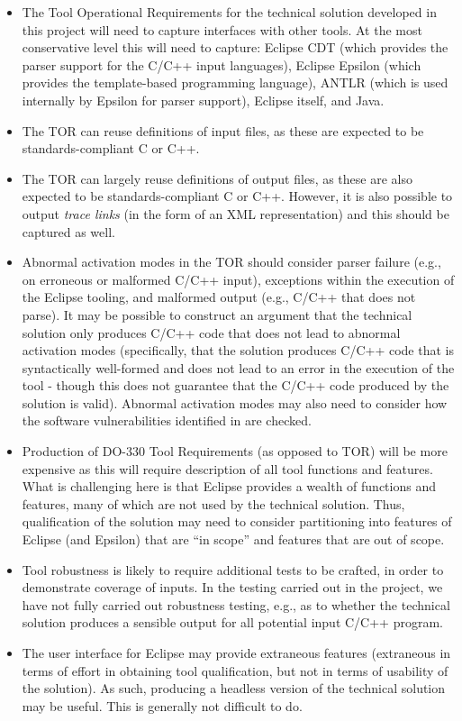 \documentclass{llncs}
\begin{document}
\begin{itemize}
\item The Tool Operational Requirements for the technical solution developed in this project will need to capture interfaces with other tools. At the most conservative level this will need to capture: Eclipse CDT (which provides the parser support for the C/C++ input languages), Eclipse Epsilon (which provides the template-based programming language), ANTLR (which is used internally by Epsilon for parser support), Eclipse itself, and Java.

\item The TOR can reuse definitions of input files, as these are expected to be standards-compliant C or C++.

\item The TOR can largely reuse definitions of output files, as these are also expected to be standards-compliant C or C++. However, it is also possible to output \textit{trace links} (in the form of an XML representation) and this should be captured as well.

\item Abnormal activation modes in the TOR should consider parser failure (e.g., on erroneous or malformed C/C++ input), exceptions within the execution of the Eclipse tooling, and malformed output (e.g., C/C++ that does not parse). It may be possible to construct an argument that the technical solution only produces C/C++ code that does not lead to abnormal activation modes (specifically, that the solution produces C/C++ code that is syntactically well-formed and does not lead to an error in the execution of the tool - though this does not guarantee that the C/C++ code produced by the solution is valid). Abnormal activation modes may also need to consider how the software vulnerabilities identified in \cite{Burns2017} are checked.

\item Production of DO-330 Tool Requirements (as opposed to TOR) will be more expensive as this will require description of all tool functions and features. What is challenging here is that Eclipse provides a wealth of functions and features, many of which are not used by the technical solution. Thus, qualification of the solution may need to consider partitioning into features of Eclipse (and Epsilon) that are ``in scope'' and features that are out of scope.

\item Tool robustness is likely to require additional tests to be crafted, in order to demonstrate coverage of inputs. In the testing carried out in the project, we have not fully carried out robustness testing, e.g., as to whether the technical solution produces a sensible output for all potential input C/C++ program.

\item The user interface for Eclipse may provide extraneous features (extraneous in terms of effort in obtaining tool qualification, but not in terms of usability of the solution). As such, producing a headless version of the technical solution may be useful. This is generally not difficult to do.
\end{itemize}
\end{document}
